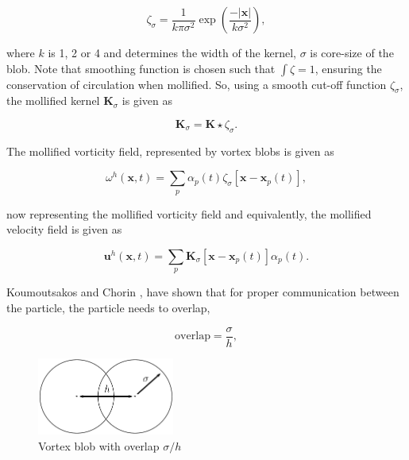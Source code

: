 	\begin{equation}
	\zeta_{\sigma} = \frac{1}{k\pi\sigma^2}\exp\left(\frac{-\left|\mathbf{x}\right|}{k\sigma^2}\right),
	\end{equation}

where $k$ is 1, 2 or 4 and determines the width of the kernel, $\sigma$ is core-size of the blob. Note that smoothing function is chosen such that $\int \zeta = 1$, ensuring the conservation of circulation when mollified. So, using a smooth cut-off function $\zeta_{\sigma}$, the mollified kernel $\mathbf{K}_{\sigma}$ is given as 

	\begin{equation}
	\mathbf{K}_{\sigma} = \mathbf{K} \star \zeta_{\sigma}.
	\end{equation}

The mollified vorticity field, represented by vortex blobs is given as

	\begin{equation}
	\omega^h\left(\mathbf{x},t\right) = \sum_p \alpha_p\left(t\right)\zeta_{\sigma}\left[\mathbf{x}-\mathbf{x}_p\left(t\right)\right],
	\label{eq:mollifiedVorticityField}
	\end{equation}

now representing the mollified vorticity field and equivalently, the mollified velocity field is given as

	\begin{equation}
	\mathbf{u}^h\left(\mathbf{x},t\right) = \sum_p \mathbf{K}_{\sigma}\left[\mathbf{x}-\mathbf{x}_p\left(t\right)\right]\alpha_p\left(t\right).
	\end{equation}

Koumoutsakos and Chorin \cite{Cottet2000a}, have shown that for proper communication between the particle, the particle needs to overlap,

	\begin{equation}
	\mathrm{overlap} = \frac{\sigma}{h},
	\end{equation}

	\begin{figure}[t]
	\centering
	\includegraphics[width=0.4\textwidth]{figures/lagrangian/blobOverlap.pdf}
	\caption{Vortex blob with overlap $\sigma/h$}
	\label{fig:blobOverlap}
	\end{figure}

